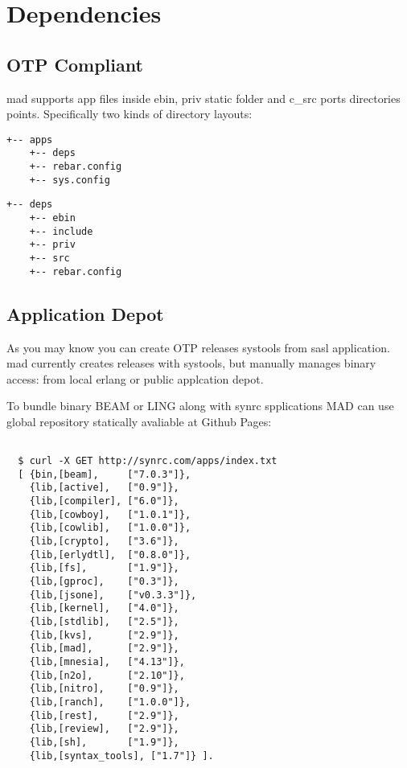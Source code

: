 \section{Dependencies}

\subsection{OTP Compliant}

mad supports app files inside ebin, priv static folder and c_src ports directories points.
Specifically two kinds of directory layouts:

\vspace{1\baselineskip}
\begin{lstlisting}[caption=Solution]
    +-- apps
    +-- deps
    +-- rebar.config
    +-- sys.config
\end{lstlisting}
\vspace{1\baselineskip}

\vspace{1\baselineskip}
\begin{lstlisting}[caption=OTP Application]
    +-- deps
    +-- ebin
    +-- include
    +-- priv
    +-- src
    +-- rebar.config
\end{lstlisting}
\vspace{1\baselineskip}

\subsection{Application Depot}

As you may know you can create OTP releases systools from sasl application.
mad currently creates releases with systools, but manually manages binary access:
from local erlang or public applcation depot.

To bundle binary BEAM or LING along with synrc spplications MAD can use
global repository statically avaliable at Github Pages:

\vspace{1\baselineskip}
\begin{lstlisting}

  $ curl -X GET http://synrc.com/apps/index.txt
  [ {bin,[beam],     ["7.0.3"]},
    {lib,[active],   ["0.9"]},
    {lib,[compiler], ["6.0"]},
    {lib,[cowboy],   ["1.0.1"]},
    {lib,[cowlib],   ["1.0.0"]},
    {lib,[crypto],   ["3.6"]},
    {lib,[erlydtl],  ["0.8.0"]},
    {lib,[fs],       ["1.9"]},
    {lib,[gproc],    ["0.3"]},
    {lib,[jsone],    ["v0.3.3"]},
    {lib,[kernel],   ["4.0"]},
    {lib,[stdlib],   ["2.5"]},
    {lib,[kvs],      ["2.9"]},
    {lib,[mad],      ["2.9"]},
    {lib,[mnesia],   ["4.13"]},
    {lib,[n2o],      ["2.10"]},
    {lib,[nitro],    ["0.9"]},
    {lib,[ranch],    ["1.0.0"]},
    {lib,[rest],     ["2.9"]},
    {lib,[review],   ["2.9"]},
    {lib,[sh],       ["1.9"]},
    {lib,[syntax_tools], ["1.7"]} ].

\end{lstlisting}
\vspace{1\baselineskip}
